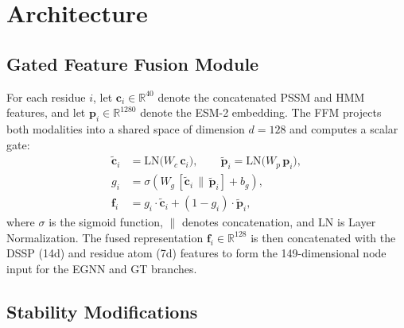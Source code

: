 \documentclass[11pt,a4paper]{article}
\begin{document}
\section{Architecture}

\subsection{Gated Feature Fusion Module}

For each residue $i$, let $\mathbf{c}_i \in \mathbb{R}^{40}$ denote the concatenated
PSSM and HMM features, and let $\mathbf{p}_i \in \mathbb{R}^{1280}$ denote the
ESM-2 embedding. The FFM projects both modalities into a shared space of dimension
$d = 128$ and computes a scalar gate:
%
\begin{align}
    \tilde{\mathbf{c}}_i &= \mathrm{LN}\bigl(W_c\,\mathbf{c}_i\bigr), \qquad
    \tilde{\mathbf{p}}_i = \mathrm{LN}\bigl(W_p\,\mathbf{p}_i\bigr), \\
    g_i &= \sigma\!\left(W_g\,[\tilde{\mathbf{c}}_i \,\|\, \tilde{\mathbf{p}}_i] + b_g\right), \\
    \mathbf{f}_i &= g_i \cdot \tilde{\mathbf{c}}_i + (1 - g_i) \cdot \tilde{\mathbf{p}}_i,
\end{align}
%
where $\sigma$ is the sigmoid function, $\|$ denotes concatenation, and
$\mathrm{LN}$ is Layer Normalization. The fused representation $\mathbf{f}_i \in \mathbb{R}^{128}$
is then concatenated with the DSSP (14d) and residue atom (7d) features to form
the 149-dimensional node input for the EGNN and GT branches.

\subsection{Stability Modifications}
\end{document}
